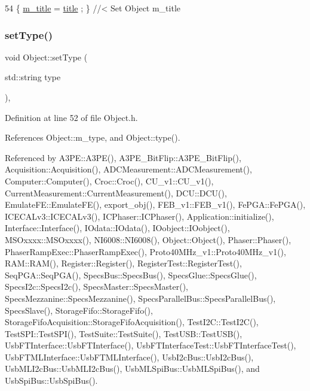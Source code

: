 \begin{DoxyCode}
54 \{ \hyperlink{classObject_affbeea1953eb5163573b92fad8f75727}{m\_title} = \hyperlink{classObject_a73a0f1a41828fdd8303dd662446fb6c3}{title} ; \} \textcolor{comment}{//< Set Object m\_title}
\end{DoxyCode}
\mbox{\label{classObject_aae534cc9d982bcb9b99fd505f2e103a5}} 
\subsubsection{\texorpdfstring{set\+Type()}{setType()}}
{\footnotesize\ttfamily void Object\+::set\+Type (\begin{DoxyParamCaption}\item[{std\+::string}]{type }\end{DoxyParamCaption})\hspace{0.3cm}{\ttfamily [inline]}, {\ttfamily [inherited]}}



Definition at line 52 of file Object.\+h.



References Object\+::m\+\_\+type, and Object\+::type().



Referenced by A3\+P\+E\+::\+A3\+P\+E(), A3\+P\+E\+\_\+\+Bit\+Flip\+::\+A3\+P\+E\+\_\+\+Bit\+Flip(), Acquisition\+::\+Acquisition(), A\+D\+C\+Measurement\+::\+A\+D\+C\+Measurement(), Computer\+::\+Computer(), Croc\+::\+Croc(), C\+U\+\_\+v1\+::\+C\+U\+\_\+v1(), Current\+Measurement\+::\+Current\+Measurement(), D\+C\+U\+::\+D\+C\+U(), Emulate\+F\+E\+::\+Emulate\+F\+E(), export\+\_\+obj(), F\+E\+B\+\_\+v1\+::\+F\+E\+B\+\_\+v1(), Fe\+P\+G\+A\+::\+Fe\+P\+G\+A(), I\+C\+E\+C\+A\+Lv3\+::\+I\+C\+E\+C\+A\+Lv3(), I\+C\+Phaser\+::\+I\+C\+Phaser(), Application\+::initialize(), Interface\+::\+Interface(), I\+Odata\+::\+I\+Odata(), I\+Oobject\+::\+I\+Oobject(), M\+S\+Oxxxx\+::\+M\+S\+Oxxxx(), N\+I6008\+::\+N\+I6008(), Object\+::\+Object(), Phaser\+::\+Phaser(), Phaser\+Ramp\+Exec\+::\+Phaser\+Ramp\+Exec(), Proto40\+M\+Hz\+\_\+v1\+::\+Proto40\+M\+Hz\+\_\+v1(), R\+A\+M\+::\+R\+A\+M(), Register\+::\+Register(), Register\+Test\+::\+Register\+Test(), Seq\+P\+G\+A\+::\+Seq\+P\+G\+A(), Specs\+Bus\+::\+Specs\+Bus(), Specs\+Glue\+::\+Specs\+Glue(), Specs\+I2c\+::\+Specs\+I2c(), Specs\+Master\+::\+Specs\+Master(), Specs\+Mezzanine\+::\+Specs\+Mezzanine(), Specs\+Parallel\+Bus\+::\+Specs\+Parallel\+Bus(), Specs\+Slave(), Storage\+Fifo\+::\+Storage\+Fifo(), Storage\+Fifo\+Acquisition\+::\+Storage\+Fifo\+Acquisition(), Test\+I2\+C\+::\+Test\+I2\+C(), Test\+S\+P\+I\+::\+Test\+S\+P\+I(), Test\+Suite\+::\+Test\+Suite(), Test\+U\+S\+B\+::\+Test\+U\+S\+B(), Usb\+F\+T\+Interface\+::\+Usb\+F\+T\+Interface(), Usb\+F\+T\+Interface\+Test\+::\+Usb\+F\+T\+Interface\+Test(), Usb\+F\+T\+M\+L\+Interface\+::\+Usb\+F\+T\+M\+L\+Interface(), Usb\+I2c\+Bus\+::\+Usb\+I2c\+Bus(), Usb\+M\+L\+I2c\+Bus\+::\+Usb\+M\+L\+I2c\+Bus(), Usb\+M\+L\+Spi\+Bus\+::\+Usb\+M\+L\+Spi\+Bus(), and Usb\+Spi\+Bus\+::\+Usb\+Spi\+Bus().


